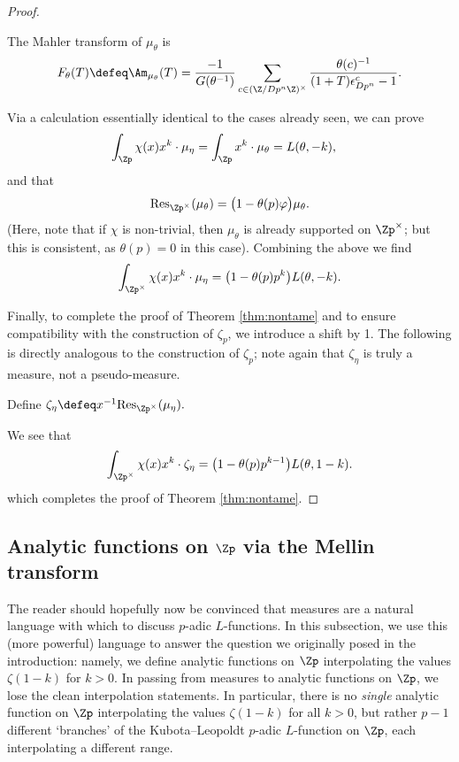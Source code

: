 \documentclass[a4paper,10pt, english, reqno]{smfart}
\numberwithin{equation}{section}
\begin{document}
\begin{proof}
\begin{lemma} \label{LemmaFtheta}
The Mahler transform of $\mu_\theta$ is
\[F_\theta(T) \defeq \Am_{\mu_\theta}(T) = \frac{-1}{G(\theta^{-1})} \sum_{c\in(\Z/Dp^n\Z)^\times}\frac{\theta(c)^{-1}}{(1+T)\epsilon_{Dp^n}^c - 1}.\]
\end{lemma}

Via a calculation essentially identical to the cases already seen, we can prove
\begin{align*}\int_{\Zp}\chi(x)x^k \cdot\mu_{\eta} &= \int_{\Zp}x^k\cdot\mu_{\theta} = L(\theta,-k),
\end{align*}
and that
\begin{equation}\label{eq:restriction mu theta}
\mathrm{Res}_{\Zp^\times}(\mu_\theta) = \big(1-\theta(p)\varphi\big) \mu_\theta.
\end{equation}
(Here, note that if $\chi$ is non-trivial, then $\mu_\theta$ is already supported on $\Zp^\times$; but this is consistent, as $\theta(p) = 0$ in this case).
Combining the above we find
\[\int_{\Zp^\times}\chi(x)x^k\cdot\mu_{\eta} = \big(1-\theta(p)p^k\big)L(\theta,-k).\]

Finally, to complete the proof of Theorem \ref{thm:nontame} and to ensure compatibility with the construction of $\zeta_p$, we introduce a shift by 1. The following is directly analogous to the construction of $\zeta_p$; note again that $\zeta_\eta$ is truly a measure, not a pseudo-measure.
\begin{definition}
	Define $\zeta_\eta \defeq x^{-1} \mathrm{Res}_{\Zp^\times}(\mu_\eta).$
\end{definition}

We see that 
\[
	\int_{\Zp^\times}\chi(x)x^k\cdot\zeta_{\eta} = \big(1-\theta(p)p^{k-1}\big)L(\theta,1-k).
\]
which completes the proof of Theorem \ref{thm:nontame}.
\end{proof}







\subsection{Analytic functions on $\Zp$ via the Mellin transform}\label{mellin}
The reader should hopefully now be convinced that measures are a natural language with which to discuss $p$-adic $L$-functions. In this subsection, we use this (more powerful) language to answer the question we originally posed in the introduction: namely, we define analytic functions on $\Zp$ interpolating the  values $\zeta(1-k)$ for $k > 0$. In passing from measures to analytic functions on $\Zp$, we lose the clean interpolation statements. In particular, there is no \emph{single} analytic function on $\Zp$ interpolating the values $\zeta(1-k)$ for all $k>0$, but rather $p-1$ different `branches' of the Kubota--Leopoldt $p$-adic $L$-function on $\Zp$, each interpolating a different range.
\end{document}
